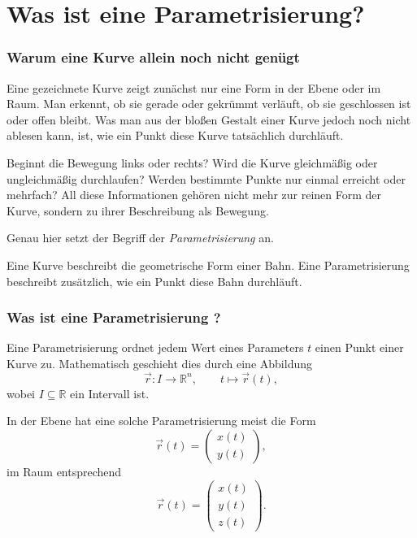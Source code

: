 \chapter{Was ist eine Parametrisierung?}


\subsection{Warum eine Kurve allein noch nicht genügt}

Eine gezeichnete Kurve zeigt zunächst nur eine Form in der Ebene oder im Raum.
Man erkennt, ob sie gerade oder gekrümmt verläuft,
ob sie geschlossen ist oder offen bleibt.
Was man aus der bloßen Gestalt einer Kurve jedoch noch nicht ablesen kann, ist,
wie ein Punkt diese Kurve tatsächlich durchläuft.

Beginnt die Bewegung links oder rechts?
Wird die Kurve gleichmäßig oder ungleichmäßig durchlaufen?
Werden bestimmte Punkte nur einmal erreicht oder mehrfach?
All diese Informationen gehören nicht mehr zur reinen Form der Kurve,
sondern zu ihrer Beschreibung als Bewegung.

Genau hier setzt der Begriff der \emph{Parametrisierung} an.

\begin{DidacticBox}[Leitidee]
	Eine Kurve beschreibt die geometrische Form einer Bahn.
	Eine Parametrisierung beschreibt zusätzlich,
	wie ein Punkt diese Bahn durchläuft.
\end{DidacticBox}


\subsection{Was ist eine Parametrisierung ?}

Eine Parametrisierung ordnet jedem Wert eines Parameters \(t\)
einen Punkt einer Kurve zu.
Mathematisch geschieht dies durch eine Abbildung
\[
\vec r:I\to\mathbb R^n,
\qquad
t\mapsto \vec r(t),
\]
wobei \(I\subseteq\mathbb R\) ein Intervall ist.

In der Ebene hat eine solche Parametrisierung meist die Form
\[
\vec r(t)=
\begin{pmatrix}
	x(t)\\
	y(t)
\end{pmatrix},
\]
im Raum entsprechend
\[
\vec r(t)=
\begin{pmatrix}
	x(t)\\
	y(t)\\
	z(t)
\end{pmatrix}.
\]

